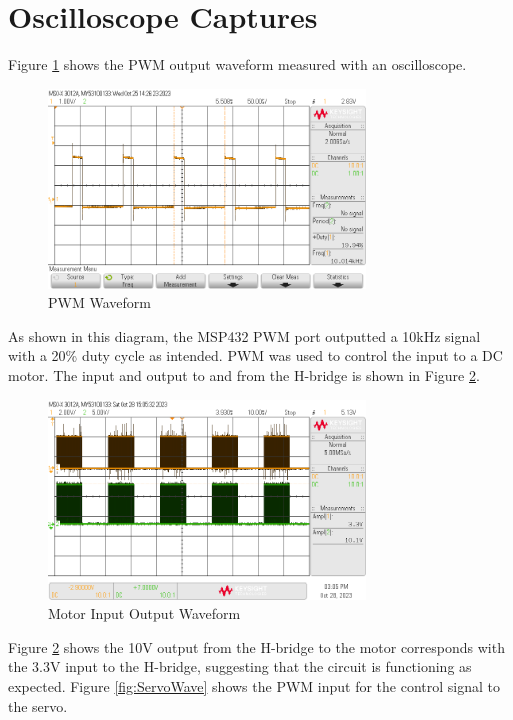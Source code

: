 \documentclass[CMPE]{KGCOEReport}
\begin{document}
\section*{Oscilloscope Captures}

Figure \ref{fig:pwm} shows the PWM output waveform measured with an oscilloscope.

\begin{figure}[H]
    \centering
    \includegraphics[width=0.75\textwidth]{PWM.png}
    \caption{PWM Waveform}
    \label{fig:pwm}
\end{figure}

As shown in this diagram, the MSP432 PWM port outputted a 10kHz signal with a 20\% duty cycle as intended. PWM was used to control the input to a DC motor. The input and output to and from the H-bridge is shown in Figure \ref{fig:motor}. 

\begin{figure}[H]
    \centering
    \includegraphics[width=0.75\textwidth]{MotorIO.png}
    \caption{Motor Input Output Waveform}
    \label{fig:motor}
\end{figure}

Figure \ref{fig:motor} shows the 10V output from the H-bridge to the motor corresponds with the 3.3V input to the H-bridge, suggesting that the circuit is functioning as expected. Figure \ref{fig:ServoWave} shows the PWM input for the control signal to the servo. 
\end{document}
